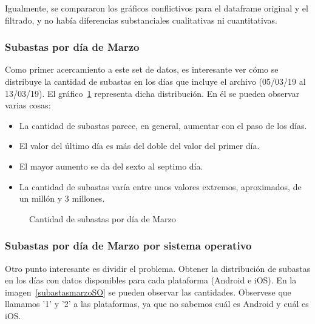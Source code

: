 \documentclass[a4paper, 12pt]{article}
\begin{document}
	 Igualmente, se compararon los gráficos conflictivos para el dataframe original y el filtrado, y no había diferencias substanciales cualitativas ni cuantitativas.
	
	
	\subsubsection{Subastas por día de Marzo}
	 Como primer acercamiento a este set de datos, es interesante ver cómo se distribuye la cantidad de subastas en los días que incluye el archivo (05/03/19 al 13/03/19).
	 El gráfico~\ref{subastasmarzo} representa dicha distribución. En él se pueden observar varias cosas:

	\begin{itemize}
		\item La cantidad de subastas parece, en general, aumentar con el paso de los días.
		\item El valor del último día es más del doble del valor del primer día.
		\item El mayor aumento se da del sexto al septimo día.
		\item La cantidad de subastas varía entre unos valores extremos, aproximados, de un millón y 3 millones.
	\end{itemize}

	\FloatBarrier
		\begin{figure}
			\centering
		   		\caption{Cantidad de subastas por día de Marzo}
			   	\label{subastasmarzo}
		\end{figure}
	\FloatBarrier

	\subsubsection{Subastas por día de Marzo por sistema operativo}
	 Otro punto interesante es dividir el problema. Obtener la distribución de subastas en los días con datos disponibles para cada plataforma (Android e iOS). En la imagen~\ref{subastasmarzoSO} se pueden observar las cantidades. Observese que llamamos '1' y '2' a las plataformas, ya que no sabemos cuál es Android y cuál es iOS.
\end{document}
